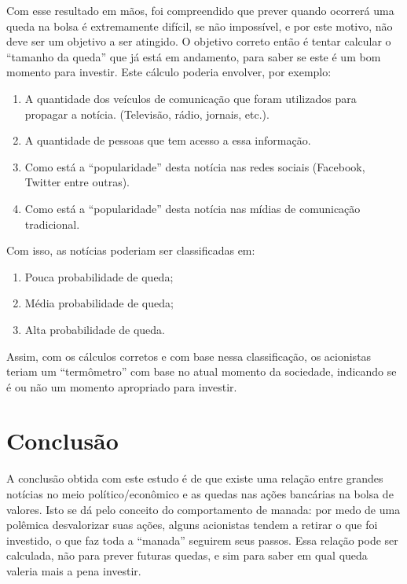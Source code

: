 \documentclass{sigchi}
\begin{document}
Com esse resultado em mãos, foi compreendido que prever quando ocorrerá uma queda na bolsa é extremamente difícil, se não impossível, e por este motivo, não deve ser um objetivo a ser atingido. O objetivo correto então é tentar calcular o “tamanho da queda” que já está em andamento, para saber se este é um bom momento para investir. Este cálculo poderia envolver, por exemplo:
\begin{enumerate}
\item A quantidade dos veículos de comunicação que foram utilizados para propagar a notícia. (Televisão, rádio, jornais, etc.).

\item A quantidade de pessoas que tem acesso a essa informação.

\item Como está a “popularidade” desta notícia nas redes sociais (Facebook, Twitter entre outras).

\item Como está a “popularidade” desta notícia nas mídias de comunicação tradicional.

\end{enumerate}


Com isso, as notícias poderiam ser classificadas em: 
\begin{enumerate}
	\item Pouca probabilidade de queda;
	
	\item Média probabilidade de queda;

	\item Alta probabilidade de queda.
\end{enumerate}



Assim, com os cálculos corretos e com base nessa classificação, os acionistas teriam um “termômetro” com base no atual momento da sociedade, indicando se é ou não um momento apropriado para investir.

\section{Conclusão}

A conclusão obtida com este estudo é de que existe uma relação entre grandes notícias no meio político/econômico e as quedas nas ações bancárias na bolsa de valores. Isto se dá pelo conceito do comportamento de manada: por medo de uma polêmica desvalorizar suas ações, alguns acionistas tendem a retirar o que foi investido, o que faz toda a “manada” seguirem seus passos. Essa relação pode ser calculada, não para prever futuras quedas, e sim para saber em qual queda valeria mais a pena investir.


\balance{}



\end{document}
